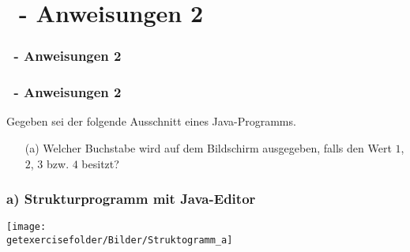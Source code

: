 \def\stitle{\theexercise\ - Anweisungen 2}
\section{\stitle}
\begin{frame}
    \frametitle{\stitle}
\tableofcontents[current]    
\end{frame}

\begin{frame}[t]%
    \frametitle{\stitle}

Gegeben sei der folgende Ausschnitt eines Java-Programms.


\begin{itemize}
\item[(a)] Welcher Buchstabe wird auf dem Bildschirm ausgegeben, falls  den Wert $1$, $2$, $3$ bzw. $4$ besitzt?
\end{itemize}
\end{frame}


\begin{frame}[fragile]%
 \frametitle{a) Strukturprogramm mit Java-Editor}%

\begin{center}

\texttt{[image: \\getexercisefolder/Bilder/Struktogramm\_a]}
\end{center}
\end{frame}
